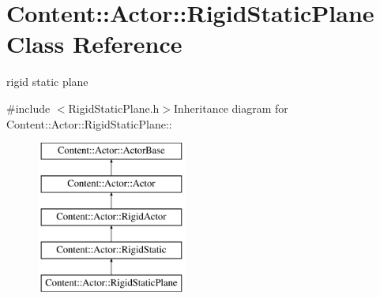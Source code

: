 \hypertarget{classContent_1_1Actor_1_1RigidStaticPlane}{
\section{Content::Actor::RigidStaticPlane Class Reference}
\label{classContent_1_1Actor_1_1RigidStaticPlane}
}


rigid static plane  


{\ttfamily \#include $<$RigidStaticPlane.h$>$}Inheritance diagram for Content::Actor::RigidStaticPlane::\begin{figure}[H]
\begin{center}
\leavevmode
\includegraphics[height=5cm]{classContent_1_1Actor_1_1RigidStaticPlane}
\end{center}
\end{figure}
